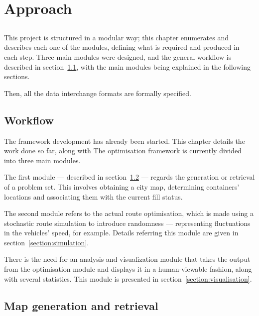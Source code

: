\chapter{Approach}
\label{chap:approach}

\section*{}

This project is structured in a modular way; this chapter enumerates and
describes each one of the modules, defining what is required and produced in
each step. Three main modules were designed, and the general workflow is
described in section~\ref{section:workflow}, with the main modules being
explained in the following sections.

Then, all the data interchange formats are formally specified.



\section{Workflow}
\label{section:workflow}




The framework development has already been started. This chapter details the
work done so far, along with 
The optimisation framework is currently divided into three main modules.

The first module --- described in section~\ref{section:map-generation} ---
regards the generation or retrieval of a problem set. This involves obtaining a
city map, determining containers' locations and associating them with the
current fill status. 

The second module refers to the actual route optimisation, which is made using
a stochastic route simulation to introduce randomness --- representing
fluctuations in the vehicles' speed, for example. Details referring this module
are given in section~\ref{section:simulation}.

There is the need for an analysis and visualization module that takes the
output from the optimisation module and displays it in a human-viewable
fashion, along with several statistics. This module is presented in
section~\ref{section:visualisation}.

\section{Map generation and retrieval}
\label{section:map-generation}

